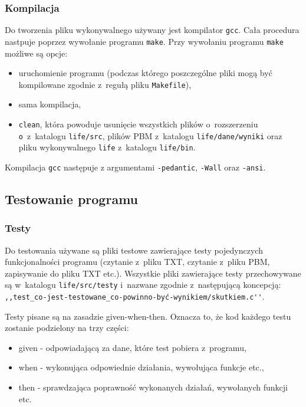 \documentclass[a4paper,12pt,oneside]{article}
\begin{document}
\subsubsection{Kompilacja}
Do tworzenia pliku wykonywalnego używany jest kompilator \verb+gcc+. Cała procedura nastpuje poprzez wywołanie programu \verb+make+. Przy wywołaniu programu \verb+make+ możliwe są opcje: 
\begin{itemize}
\item uruchomienie programu (podczas którego poszczególne pliki mogą być kompilowane zgodnie z~regułą pliku \verb+Makefile+),
\item sama kompilacja, 
\item \verb+clean+, która powoduje usunięcie wszystkich plików o~rozszerzeniu \verb+o+~z~katalogu \verb+life/src+, plików PBM z~katalogu \verb+life/dane/wyniki+ oraz pliku wykonywalnego \verb+life+ z~katalogu \verb+life/bin+.
\end{itemize}
\par
Kompilacja \verb+gcc+ następuje z argumentami \verb+-pedantic+, \verb+-Wall+ oraz \verb+-ansi+.

\subsection{Testowanie programu}

\subsubsection{Testy}
Do testowania używane są pliki testowe zawierające testy pojedynczych funkcjonalności programu (czytanie z~pliku TXT, czytanie z~pliku PBM, zapisywanie do pliku TXT etc.). Wszystkie pliki zawierające testy przechowywane są w~katalogu \verb+life/src/testy+ i~nazwane zgodnie z~następującą koncepcją: \verb+,,test_co-jest-testowane_co-powinno-być-wynikiem/skutkiem.c''+.

\par
Testy pisane są na zasadzie given-when-then. Oznacza to, że kod każdego testu zostanie podzielony na trzy części:
\begin{itemize}
\item given - odpowiadającą za dane, które test pobiera z~programu,
\item when - wykonująca odpowiednie działania, wywołująca funkcje etc.,
\item then - sprawdzająca poprawność wykonanych działań, wywołanych funkcji etc.
\end{itemize}
\end{document}
